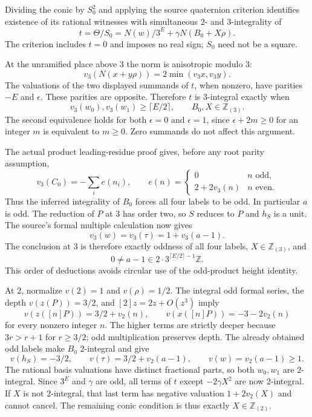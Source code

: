 Dividing the conic by $S_0^2$ and applying the source quaternion criterion
identifies existence of its rational witnesses with simultaneous
$2$- and $3$-integrality of
\[
 t=\Theta/S_0=N(w)/3^E+\gamma N(B_0+X\rho).
\]
The criterion includes $t=0$ and imposes no real sign; $S_0$ need not
be a square.

At the unramified place above $3$ the norm is anisotropic modulo $3$:
\[
 v_3(N(x+y\rho))=2\min(v_3x,v_3y).
\]
The valuations of the two displayed summands of $t$, when nonzero, have
parities $-E$ and $\epsilon$.  These parities are opposite.  Therefore
$t$ is $3$-integral exactly when
\[
 v_3(w_0),v_3(w_1)\ge\lceil E/2\rceil,
 \qquad B_0,X\in\mathbb Z_{(3)}.
\]
The second equivalence holds for both $\epsilon=0$ and $\epsilon=1$,
since $\epsilon+2m\ge0$ for an integer $m$ is equivalent to $m\ge0$.
Zero summands do not affect this argument.

The actual product leading-residue proof gives, before any root parity
assumption,
\[
 v_3(C_0)=-\sum_i e(n_i),\qquad
 e(n)=\begin{cases}0&n\text{ odd},\\2+2v_3(n)&n\text{ even}.
 \end{cases}
\]
Thus the inferred integrality of $B_0$ forces all four labels to be odd.
In particular $a$ is odd.  The reduction of $P$ at $3$ has order two,
so $S$ reduces to $P$ and $h_S$ is a unit.  The source's formal multiple
calculation now gives
\[
 v_3(w)=v_3(\tau)=1+v_3(a-1).
\]
The conclusion at $3$ is therefore exactly oddness of all four labels,
$X\in\mathbb Z_{(3)}$, and
\begin{equation}\label{r7:index}
 0\ne a-1\in2\cdot3^{\lceil E/2\rceil-1}\mathbb Z.
\end{equation}
This order of deductions avoids circular use of the odd-product height
identity.

At $2$, normalize $v(2)=1$ and $v(\rho)=1/2$.  The integral odd formal
series, the depth $v(z(P))=3/2$, and
$[2]z=2z+O(z^3)$ imply
\[
 v(z([n]P))=3/2+v_2(n),\qquad
 v(x([n]P))=-3-2v_2(n)
\]
for every nonzero integer $n$.  The higher terms are strictly deeper
because $3r>r+1$ for $r\ge3/2$; odd multiplication preserves depth.
The already obtained odd labels make $B_0$ $2$-integral and give
\[
 v(h_S)=-3/2,\qquad v(\tau)=3/2+v_2(a-1),\qquad
 v(w)=v_2(a-1)\ge1.
\]
The rational basis valuations have distinct fractional parts, so both
$w_0,w_1$ are $2$-integral.  Since $3^E$ and $\gamma$ are odd, all
terms of $t$ except $-2\gamma X^2$ are now $2$-integral.  If $X$ is
not $2$-integral, that last term has negative valuation
$1+2v_2(X)$ and cannot cancel.  The remaining conic condition is thus
exactly $X\in\mathbb Z_{(2)}$.

